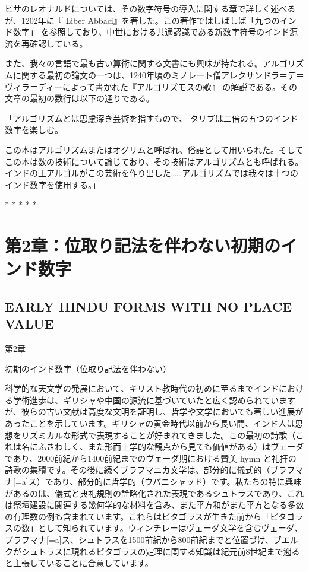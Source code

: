 \documentclass[a4paper,11pt,openany]{ltjsbook}
\begin{document}
ピサのレオナルドについては、その数字符号の導入に関する章で詳しく述べるが、1202年に『 Liber Abbaci』を著した。この著作ではしばしば「九つのインド数字」 を参照しており、中世における共通認識である新数字符号のインド源流を再確認している。

また、我々の言語で最も古い算術に関する文書にも興味が持たれる。アルゴリズムに関する最初の論文の一つは、1240年頃のミノレート僧アレクサンドラ＝デ＝ヴィラ＝ディーによって書かれた『アルゴリズモスの歌』 の解説である。その文章の最初の数行は以下の通りである。

「アルゴリズムとは思慮深き芸術を指すもので、
  タリブは二倍の五つのインド数字を楽しむ。

この本はアルゴリズムまたはオグリムと呼ばれ、俗語として用いられた。そしてこの本は数の技術について論じており、その技術はアルゴリズムとも呼ばれる。インドの王アルゴルがこの芸術を作り出した……アルゴリズムでは我々は十つのインド数字を使用する。」

*       *       *       *       *

\clearpage

\chapter{第2章：位取り記法を伴わない初期のインド数字}
\section*{EARLY HINDU FORMS WITH NO PLACE VALUE}

第2章

初期のインド数字（位取り記法を伴わない）

科学的な天文学の発展において、キリスト教時代の初めに至るまでインドにおける学術進歩は、ギリシャや中国の源流に基づいていたと広く認められていますが、彼らの古い文献は高度な文明を証明し、哲学や文学においても著しい進展があったことを示しています。ギリシャの黄金時代以前から長い間、インド人は思想をリズミカルな形式で表現することが好まれてきました。この最初の詩歌（これは名にふさわしく、また形而上学的な観点から見ても価値がある）はヴェーダであり、2000前紀から1400前紀までのヴェーダ期における賛美 hymn と礼拝の詩歌の集積です。その後に続くブラフマニカ文学は、部分的に儀式的（ブラフマナ[=a]ス）であり、部分的に哲学的（ウパニシャッド）です。私たちの特に興味があるのは、儀式と典礼規則の詮略化された表現であるシュトラスであり、これは祭壇建設に関連する幾何学的な材料を含み、また平方和がまた平方となる多数の有理数の例も含まれています。これらはピタゴラスが生きた前から「ピタゴラスの数」として知られています。ウィンチレーはヴェーダ文学を含むヴェーダ、ブラフマナ[=a]ス、シュトラスを1500前紀から800前紀までと位置づけ、ブエルクがシュトラスに現れるピタゴラスの定理に関する知識は紀元前8世紀まで遡ると主張していることに合意しています。
\end{document}

